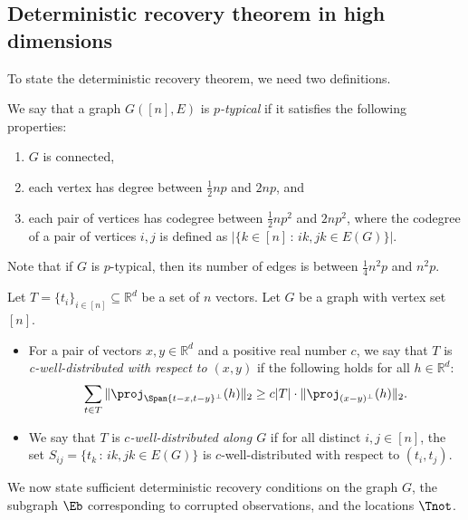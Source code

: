

\subsection{Deterministic recovery theorem in high dimensions} \label{sec-deterministic-theorem}

To state the deterministic recovery theorem, we need two definitions.

\begin{definition}
We say that a graph $G([n],E)$ is \emph{$p$-typical} if it satisfies the following
properties:
\begin{enumerate}
  \setlength{\itemsep}{1pt} \setlength{\parskip}{0pt}
  \setlength{\parsep}{0pt}
	\item $G$ is connected,
	\item each vertex has degree between $\frac{1}{2}np$ and $2np$, and
	\item each pair of vertices has codegree between $\frac{1}{2}np^{2}$ and
$2np^{2}$, where the codegree of a pair of vertices $i,j$ is defined as $|\{k \in [n]\,:\, ik,jk \in E(G)\}|$.
\end{enumerate}
\end{definition}
Note that if $G$ is $p$-typical, then its number of edges is between $\frac{1}{4}n^{2}p$ and $n^{2}p$.


\begin{definition}
Let $T=\{t_{i}\}_{i\in[n]}\subseteq\mathbb{R}^{d}$ be a set of $n$
vectors. Let $G$ be a graph with vertex set $[n]$.
\begin{itemize}
  \setlength{\itemsep}{1pt} \setlength{\parskip}{0pt}
  \setlength{\parsep}{0pt}
\item[(i)] For a pair of vectors $x,y\in\mathbb{R}^{d}$ and a positive real
number $c$, we say that $T$ is \emph{c-well-distributed with respect
to $(x,y)$} if the following holds for all $h\in\mathbb{R}^{d}$:
\[
	\sum_{t \in T}\|\proj_{\Span\{t-x,t-y\}^{\perp}}(h)\|_2 \ge c|T|\cdot\|\proj_{(x-y)^{\perp}}(h)\|_2.
\]
\item[(ii)] We say that $T$ is \emph{$c$-well-distributed along $G$} if
for all distinct $i,j\in[n]$, the set $S_{ij}=\{t_{k}\,:\, ik,jk\in E(G)\}$
is $c$-well-distributed with respect to $(t_{i},t_{j})$.
\end{itemize}
\end{definition}


We now state sufficient deterministic recovery conditions on the graph $G$, the subgraph $\Eb$ corresponding to corrupted observations, and the locations $\Tnot$.

